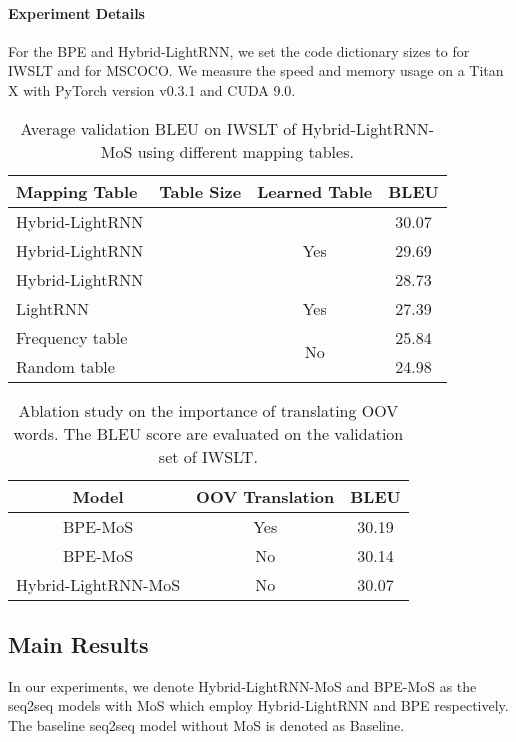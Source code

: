 \documentclass[letterpaper]{article} \usepackage{aaai19}  \usepackage{times}  \usepackage{helvet}  \usepackage{courier}  \usepackage{url}  \usepackage{graphicx}  \frenchspacing  \usepackage{booktabs}
\begin{document}
\paragraph{Experiment Details}
For the BPE and Hybrid-LightRNN, we set the code dictionary sizes to  for IWSLT and  for MSCOCO. 
We measure the speed and memory usage on a Titan X with PyTorch version v0.3.1 and CUDA 9.0. 

\begin{table}[ht]
\centering
\small


 \begin{tabular}{l|c|c|c} 
 \toprule
Mapping Table & Table Size & Learned Table & BLEU \\
 \midrule
  Hybrid-LightRNN &  & \multirow{3}{*}{Yes} & 30.07 \\ Hybrid-LightRNN &   & & 29.69\\ Hybrid-LightRNN &  & & 28.73  \\ \midrule
 LightRNN &  & Yes & 27.39 \\ \midrule
 Frequency table &  & \multirow{2}{*}{No} & 25.84 \\ Random table &  & & 24.98 \\ \bottomrule
 \end{tabular}
 \caption{Average validation BLEU on IWSLT of Hybrid-LightRNN-MoS using different mapping tables.}
 \label{tab:lightas-results}
\end{table}


\begin{table}
\centering


\small
\begin{tabular}{c|c|c} 
\toprule
Model  & OOV Translation & BLEU \\
\midrule
BPE-MoS  & Yes & 30.19\\
BPE-MoS  & No & 30.14\\
Hybrid-LightRNN-MoS & No & 30.07\\
\bottomrule
\end{tabular}
\caption{Ablation study on the importance of translating OOV words. The BLEU score are evaluated on the validation set of IWSLT.}
\label{tab:oov}

\end{table}


\subsection{Main Results}
In our experiments, we denote Hybrid-LightRNN-MoS and BPE-MoS as the seq2seq models with MoS which employ Hybrid-LightRNN and BPE respectively. The baseline seq2seq model without MoS is denoted as Baseline. 
\end{document}
